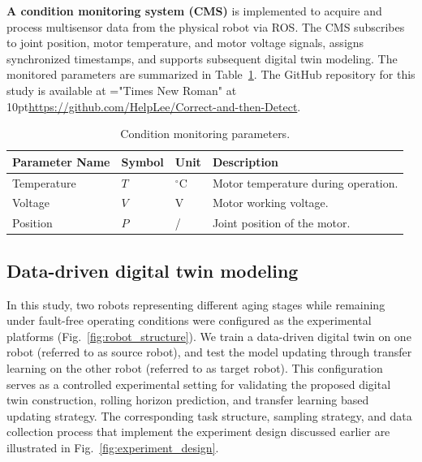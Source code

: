\documentclass[a4paper,10pt]{cas-sc}%
\newcommand{\roundtworev}[1]{\textcolor{roundtwored}{#1}}
\newcommand{\repositoryurl}[1]{{\font\repositoryfont="Times New Roman" at 10pt\def\UrlFont{\repositoryfont}\url{#1}}}
\begin{document}
\roundtworev{\textbf{A condition monitoring system (CMS)} is implemented to acquire and process multisensor data from the physical robot via ROS.}
The CMS subscribes to joint position, motor temperature, and motor voltage signals, assigns synchronized timestamps, and supports subsequent digital twin modeling.
The monitored parameters are summarized in Table~\ref{tab:cms_parameters}. \roundtworev{The GitHub repository for this study is available at \repositoryurl{https://github.com/HelpLee/Correct-and-then-Detect}.}

\begin{table}[htbp]
	\centering
	\caption{Condition monitoring parameters.}
	\label{tab:cms_parameters}
	\begin{tabular}{p{}p{}p{}p{}}
		\toprule
 \textbf{Parameter Name} & \textbf{Symbol} & \textbf{Unit} & \textbf{Description} \\
		\midrule
		Temperature & $T$             & $\mathrm{^\circ C}$ & Motor temperature during operation. \\
		Voltage & $V$             & V                   & Motor working voltage.              \\
		Position & $P$             & /                   & Joint position of the motor.        \\
		\bottomrule
	\end{tabular}
\end{table}



%
%
\subsection{Data-driven digital twin modeling}\label{sec:5.2}

\roundtworev{In this study, two robots representing different aging stages while remaining under fault-free operating conditions were configured as the experimental platforms (Fig.~\ref{fig:robot_structure}).} We train a data-driven digital twin on one robot (referred to as source robot), and test the model updating through transfer learning on the other robot (referred to as target robot). This configuration serves as a controlled experimental setting for validating the proposed digital twin construction, rolling horizon prediction, and transfer learning based updating strategy. The corresponding task structure, sampling strategy, and data collection process that implement the experiment design discussed earlier are illustrated in Fig.~\ref{fig:experiment_design}.
\end{document}
